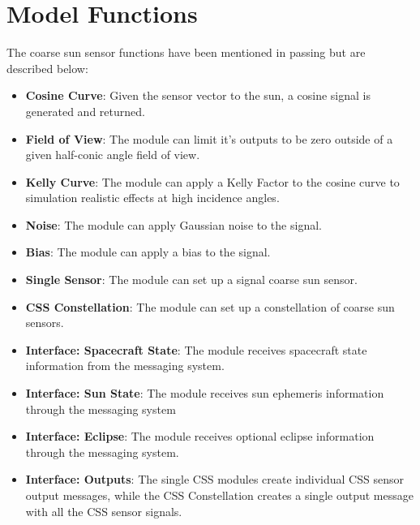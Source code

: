 
\section{Model Functions}
The coarse sun sensor functions have been mentioned in passing but are described below:
\begin{itemize}
	\item \textbf{Cosine Curve}: Given the sensor vector to the sun, a cosine signal is generated and returned.
	\item \textbf{Field of View}: The module can limit it's outputs to be zero outside of a given half-conic angle field of view.
	\item \textbf{Kelly Curve}: The module can apply a Kelly Factor to the cosine curve to simulation realistic effects at high incidence angles.
	\item \textbf{Noise}: The module can apply Gaussian noise to the signal.
	\item \textbf{Bias}: The module can apply a bias to the signal.
	\item \textbf{Single Sensor}: The module can set up a signal coarse sun sensor.
	\item \textbf{CSS Constellation}: The module can set up a constellation of coarse sun sensors.
	\item \textbf{Interface: Spacecraft State}: The module receives spacecraft state information from the messaging system.
	\item \textbf{Interface: Sun State}: The module receives sun ephemeris information through the messaging system
	\item \textbf{Interface: Eclipse}: The module receives optional eclipse information through the messaging system.
	\item \textbf{Interface: Outputs}: The single CSS modules create individual CSS sensor output messages, while the CSS Constellation creates a single output message with all the CSS sensor signals.
\end{itemize}

